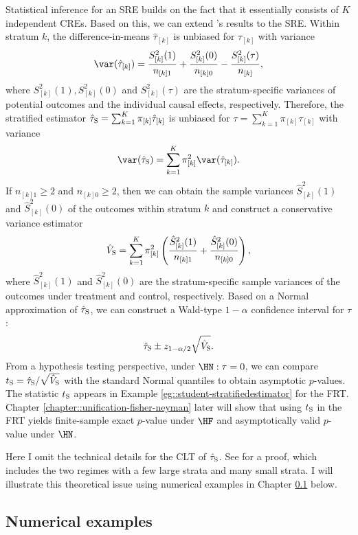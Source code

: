 Statistical inference for an SRE builds on the fact that it essentially consists of $K$ independent CREs. Based on this, we can extend \citet{Neyman:1923}'s results to the SRE.  Within stratum $k$, the difference-in-means $\hat{\tau}_{[k]}$ is unbiased for $\tau_{[k]}$ with variance
$$
\var ( \hat{\tau}_{[k]}) =  \frac{S_{[k]}^2(1)}{ n_{[k]1} } +  \frac{S_{[k]}^2(0)}{ n_{[k]0} }
- \frac{  S_{[k]}^2(\tau) }{ n_{[k]} },
$$
where $ S_{[k]}^2(1), S_{[k]}^2(0)$ and $S_{[k]}^2(\tau)$ are the stratum-specific variances of potential outcomes and the individual causal effects, respectively. 
Therefore, the stratified estimator $\hat{\tau}_\textsc{S} = \sum_{k=1}^K  \pi_{[k]} \hat{\tau}_{[k]}$ is unbiased for $\tau =\sum_{k=1}^K  \pi_{[k]}  \tau_{[k]} $ with variance
$$
\var( \hat{\tau}_\textsc{S}   ) = \sum_{k=1}^K  \pi_{[k]}^2   \var ( \hat{\tau}_{[k]}).
$$
If $n_{[k]1} \geq 2$ and $n_{[k]0} \geq 2$, then we can obtain the sample variances $\hat{S}_{[k]}^2(1)$ and $\hat{S}_{[k]}^2(0)$ of the outcomes within stratum $k$ and construct a conservative variance estimator
$$
\hat{V}_\textsc{S}  = \sum_{k=1}^K  \pi_{[k]}^2 \left(  \frac{\hat{S}_{[k]}^2(1)}{ n_{[k]1} } +  \frac{ \hat{S}_{[k]}^2(0)}{ n_{[k]0} } \right), 
$$  
where $\hat{S}_{[k]}^2(1)$ and $\hat{S}_{[k]}^2(0)$ are the stratum-specific sample variances of the outcomes under treatment and control, respectively. Based on a Normal approximation of $\hat{\tau}_\textsc{S} $, we can construct a Wald-type $1-\alpha$ confidence interval for $\tau$:
$$
\hat{\tau}_\textsc{S} \pm z_{1-\alpha/2} \sqrt{  \hat{V}_\textsc{S}  } . 
$$
From a hypothesis testing perspective, under $\HN: \tau=0$, we can compare $t_\textsc{S} =   \hat{\tau}_\textsc{S} / \sqrt{  \hat{V}_\textsc{S}  }$ with the standard Normal quantiles to obtain asymptotic $p$-values. The statistic $t_\textsc{S} $ appears in Example \ref{eg::student-stratifiedestimator} for the FRT. Chapter \ref{chapter::unification-fisher-neyman} later will show that using  $t_\textsc{S} $ in the FRT yields finite-sample exact $p$-value under $\HF$  and asymptotically valid $p$-value under $\HN$. 



Here I omit the technical details for the CLT of $\hat{\tau}_\textsc{S} $. See \citet{liu2020regression} for a proof,  which includes the two regimes with a few large strata and many small strata. I will illustrate this theoretical issue using numerical examples in Chapter \ref{sec::sre-neyman-example} below. 


\subsection{Numerical examples}
\label{sec::sre-neyman-example}

